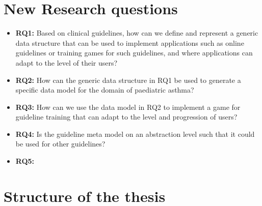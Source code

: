 \section{New Research questions}
\begin{itemize}
	\item \textbf{RQ1:} Based on clinical guidelines, how can we define and represent a generic data structure that can be used to implement applications such as online guidelines or training games for such guidelines, and where applications can adapt to the level of their users?
	\item \textbf{RQ2:} How can the generic data structure in RQ1 be used to generate a specific data model for the domain of paediatric asthma?
	\item \textbf{RQ3:} How can we use the data model in RQ2 to implement a game for guideline training that can adapt to the level and progression  of users?
	\item \textbf{RQ4:} Is the guideline meta model on an abstraction level such that it could be used for other guidelines? 
	\item \textbf{RQ5:}
\end{itemize}
\section{Structure of the thesis}